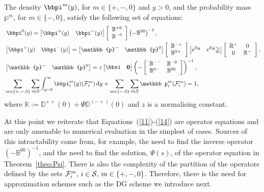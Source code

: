 \begin{theo} 
	\label{theo:density} 
The density ${\bbpi}^{m}(y)$, for $m \in \{+,-,0\}$ and $y > 0$, and the probability mass $\mathbb{p}^{m}$, for $m \in \{-,0\}$, satisfy the following set of equations:
% 	 
	\begin{align} 
	&\label{11} \; \bbpi^{0}(y) = \vligne{\bbpi^{+}(y) & \bbpi^{-}(y)}\left[\begin{array}{l} \mathbb{B}^{+0} \\ \mathbb{B}^{-0} \end{array} \right]\left(-\mathbb{B}^{00}\right)^{-1}, \\
	&  \vligne{\bbpi^{+}(y) & \bbpi^{-}(y)} = \vligne{\mathbb{p}^{-} & \mathbb{p}^{0}}\left[\begin{array}{l} \mathbb{B}^{-+} \\ \mathbb{B}^{0+} \end{array} \right]\vligne{e^{\mathbb{K}y} & e^{\mathbb{K}y}\mathbb\Psi}\left[\begin{array}{cc} \mathbb{R}^{+} & 0 \\ 0 & \mathbb{R}^{-}\end{array}\right], \\
	&  \vligne{\mathbb{p}^{-}  & \mathbb{p}^{0}} = z \vligne{{\bbxi} & \bs{0}} 
	\left(-\left[\begin{array}{ll} 
		\mathbb{B}^{--} & \mathbb{B}^{-0} \\
		\mathbb{B}^{0-} & \mathbb{B}^{00} 
		\end{array} \right] \right)^{-1},  \label{eqn:mass}\\
	& \sum_{m \in \{+,-,0\}}\sum_{i \in \mathcal{S}} \int_{y = 0}^{\infty} \bbpi_i^{m}(y)(\mathcal{F}^{m}_i)\wrt y + \sum_{m \in \{-,0\}} \sum_{i \in \mathcal{S}}\mathbb p^{m}_i(\mathcal{F}^{m}_i) = 1, \label{14}
	\end{align}
	where $\mathbb{K} := \mathbb{D}^{++}(0) + \mathbb\Psi\mathbb{D}^{(-+)}(0)$ and $z$ is a normalising constant. 
\end{theo} 

At this point we reiterate that Equations~(\ref{11})-(\ref{14}) are operator equations and are only amenable to numerical evaluation in the simplest of cases. Sources of this intractability come from, for example, the need to find the inverse operator \(( - \mathbb B^{00})^{-1}\), and the need to find the solution, \(\mathbb \Psi(s)\), of the operator equation in Theorem~\ref{theo:Psi}. There is also the complexity of the partition of the operators defined by the sets \(\mathcal F_{i}^m,\, i\in\mathcal{S},\,m\in\{+,-,0\}\). Therefore, there is the need for approximation schemes such as the DG scheme we introduce next.


